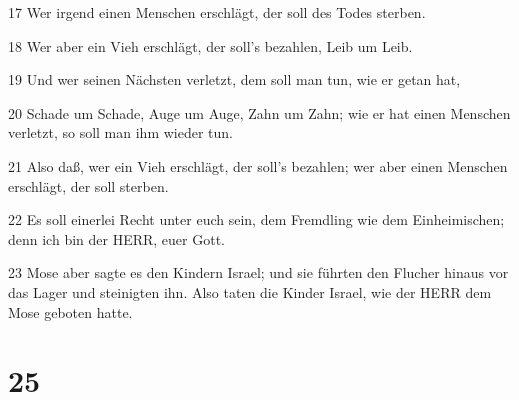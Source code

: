 \par 17 Wer irgend einen Menschen erschlägt, der soll des Todes sterben.
\par 18 Wer aber ein Vieh erschlägt, der soll's bezahlen, Leib um Leib.
\par 19 Und wer seinen Nächsten verletzt, dem soll man tun, wie er getan hat,
\par 20 Schade um Schade, Auge um Auge, Zahn um Zahn; wie er hat einen Menschen verletzt, so soll man ihm wieder tun.
\par 21 Also daß, wer ein Vieh erschlägt, der soll's bezahlen; wer aber einen Menschen erschlägt, der soll sterben.
\par 22 Es soll einerlei Recht unter euch sein, dem Fremdling wie dem Einheimischen; denn ich bin der HERR, euer Gott.
\par 23 Mose aber sagte es den Kindern Israel; und sie führten den Flucher hinaus vor das Lager und steinigten ihn. Also taten die Kinder Israel, wie der HERR dem Mose geboten hatte.

\chapter{25}

